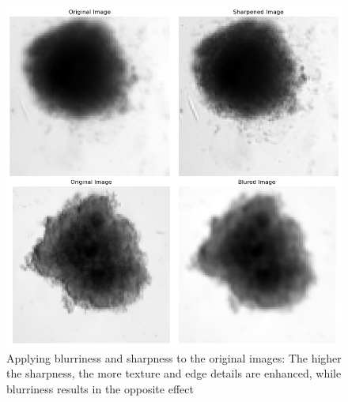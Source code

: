 \begin{figure}[H]
  \centering
  \includegraphics[scale=0.5]{figures/bs.png} 
  \caption{Applying blurriness and sharpness to the original images: The higher the sharpness, the more texture and edge details are enhanced, while blurriness results in the opposite effect}
  \label{fig:bs}
\end{figure}

